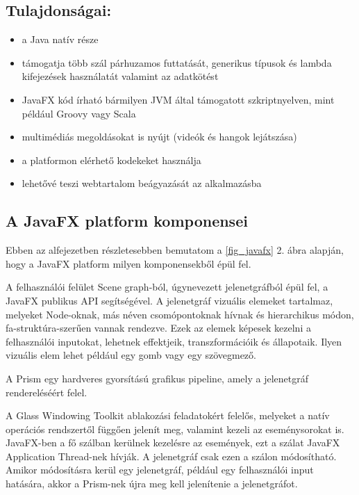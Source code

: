 \subsection*{Tulajdonságai:}
\begin{itemize}
\item a Java natív része 
\item támogatja több szál párhuzamos futtatását, generikus típusok és lambda kifejezések használatát valamint az adatkötést 
\item JavaFX kód írható bármilyen JVM által támogatott szkriptnyelven, mint például Groovy vagy Scala 
\item multimédiás megoldásokat is nyújt (videók és hangok lejátszása) 
\item a platformon elérhető kodekeket használja 
\item lehetővé teszi webtartalom beágyazását az alkalmazásba
\end{itemize}

\subsection*{A JavaFX platform komponensei}

Ebben az alfejezetben részletesebben bemutatom a \ref{fig_javafx} 2. ábra alapján, hogy a JavaFX platform milyen komponensekből épül fel. 



A felhasználói felület Scene graph-ból, úgynevezett jelenetgráfból épül fel, a JavaFX publikus API segítségével.
A jelenetgráf vizuális elemeket tartalmaz, melyeket Node-oknak, más néven csomópontoknak hívnak és hierarchikus módon, fa-struktúra-szerűen vannak rendezve.
Ezek az elemek képesek kezelni a felhasználói inputokat, lehetnek effektjeik, transzformációik és állapotaik.
Ilyen vizuális elem lehet például egy gomb vagy egy szövegmező. 

A Prism egy hardveres gyorsítású grafikus pipeline, amely a jelenetgráf rendereléséért felel.

A Glass Windowing Toolkit ablakozási feladatokért felelős, melyeket a natív operációs rendszertől függően jelenít meg, valamint kezeli az eseménysorokat is.
JavaFX-ben a fő szálban kerülnek kezelésre az események, ezt a szálat JavaFX Application Thread-nek hívják.
A jelenetgráf csak ezen a szálon módosítható.
Amikor módosításra kerül egy jelenetgráf, például egy felhasználói input hatására, akkor a Prism-nek újra meg kell jelenítenie a jelenetgráfot.

